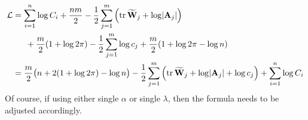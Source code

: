 \begin{align*}
  \cL 
  &= \sum_{i=1}^n \log C_i + \half[nm] - \half \sum_{j=1}^m \left( \tr \btW_j + \log \abs{\bA_j} \right) \\
  &\phantom{==} + \half[m](1 + \log 2\pi) - \half \sum_{j=1}^m \log c_j + \half[m] (1 + \log 2\pi - \log n) \\
  &= \half[m]\big(n + 2(1 + \log 2\pi) - \log n \big)
  - \half \sum_{j=1}^m \left( \tr \btW_j + \log \abs{\bA_j} + \log c_j \right) + \sum_{i=1}^n \log C_i
\end{align*}
Of course, if using either single $\alpha$ or single $\lambda$, then the formula needs to be adjusted accordingly.
